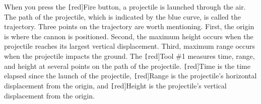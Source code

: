 \documentclass[main-physics.tex]{subfiles}
\begin{document}
\begin{center}
    \hspace{5mm}
    \hspace{5mm}
\end{center}

When you press the \texttt[red]{Fire} button, a projectile is launched through the air. The path of the projectile, which is indicated by the blue curve, is called the trajectory. Three points on the trajectory are worth mentioning. First, the origin is where the cannon is positioned. Second, the maximum height occurs when the projectile reaches its largest vertical displacement. Third, maximum range occurs when the projectile impacts the ground. The \texttt[red]{Tool \#1} measures time, range, and height at several points on the path of the projectile. \texttt[red]{Time} is the time elapsed since the launch of the projectile, \texttt[red]{Range} is the projectile's horizontal displacement from the origin, and \texttt[red]{Height} is the projectile's vertical displacement from the origin. 
\end{document}
